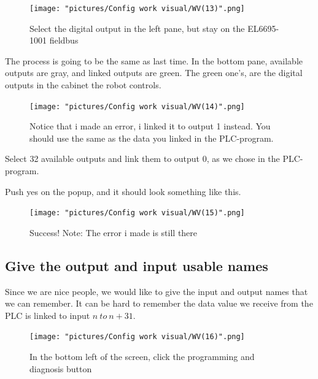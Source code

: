 \documentclass{article}
\begin{document}
\begin{figure}[!h]
    \centering
    \texttt{[image: "pictures/Config work visual/WV(13)".png]}
    \caption{Select the digital output in the left pane, but stay on the EL6695-1001 fieldbus }
   
\end{figure}

\newpage

The process is going to be the same as last time. In the bottom pane, available outputs are gray, and linked outputs are green. The green one's, are the digital outputs in the cabinet the robot controls. 

\begin{figure}[!h]
    \centering
    \texttt{[image: "pictures/Config work visual/WV(14)".png]}
    \caption{Notice that i made an error, i linked it to output 1 instead. You should use the same as the data you linked in the PLC-program.  }
   
\end{figure}

Select 32 available outputs and link them to output 0, as we chose in the PLC-program.

\newpage

Push yes on the popup, and it should look something like this.

\begin{figure}[!h]
    \centering
    \texttt{[image: "pictures/Config work visual/WV(15)".png]}
    \caption{Success! Note: The error i made is still there}
   
\end{figure}

\newpage

\subsection{Give the output and input usable names}
Since we are nice people, we would like to give the input and output names that we can remember. It can be hard to remember the data value we receive from the PLC is linked to input $n\:to\:n+31$. 


\begin{figure}[!h]
    \centering
    \texttt{[image: "pictures/Config work visual/WV(16)".png]}
    \caption{In the bottom left of the screen, click the programming and diagnosis button}
    
\end{figure}

\newpage
\end{document}
